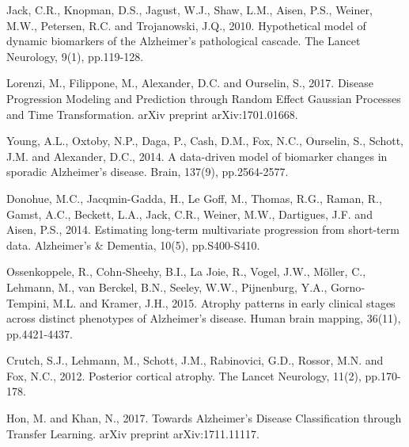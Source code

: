 \documentclass{llncs}
\begin{document}
%


\begin{thebibliography}{5}

Jack, C.R., Knopman, D.S., Jagust, W.J., Shaw, L.M., Aisen, P.S., Weiner, M.W., Petersen, R.C. and Trojanowski, J.Q., 2010. Hypothetical model of dynamic biomarkers of the Alzheimer's pathological cascade. The Lancet Neurology, 9(1), pp.119-128.

Lorenzi, M., Filippone, M., Alexander, D.C. and Ourselin, S., 2017. Disease Progression Modeling and Prediction through Random Effect Gaussian Processes and Time Transformation. arXiv preprint arXiv:1701.01668.

Young, A.L., Oxtoby, N.P., Daga, P., Cash, D.M., Fox, N.C., Ourselin, S., Schott, J.M. and Alexander, D.C., 2014. A data-driven model of biomarker changes in sporadic Alzheimer's disease. Brain, 137(9), pp.2564-2577.

Donohue, M.C., Jacqmin-Gadda, H., Le Goff, M., Thomas, R.G., Raman, R., Gamst, A.C., Beckett, L.A., Jack, C.R., Weiner, M.W., Dartigues, J.F. and Aisen, P.S., 2014. Estimating long-term multivariate progression from short-term data. Alzheimer's \& Dementia, 10(5), pp.S400-S410.

Ossenkoppele, R., Cohn‐Sheehy, B.I., La Joie, R., Vogel, J.W., Möller, C., Lehmann, M., van Berckel, B.N., Seeley, W.W., Pijnenburg, Y.A., Gorno‐Tempini, M.L. and Kramer, J.H., 2015. Atrophy patterns in early clinical stages across distinct phenotypes of Alzheimer's disease. Human brain mapping, 36(11), pp.4421-4437.

Crutch, S.J., Lehmann, M., Schott, J.M., Rabinovici, G.D., Rossor, M.N. and Fox, N.C., 2012. Posterior cortical atrophy. The Lancet Neurology, 11(2), pp.170-178.

Hon, M. and Khan, N., 2017. Towards Alzheimer's Disease Classification through Transfer Learning. arXiv preprint arXiv:1711.11117.


\end{thebibliography}

\clearpage
\end{document}
